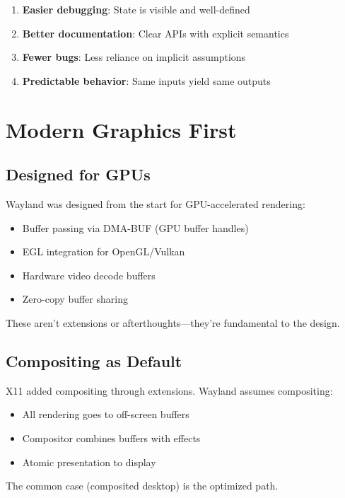 \begin{enumerate}
    \item \textbf{Easier debugging}: State is visible and well-defined
    \item \textbf{Better documentation}: Clear APIs with explicit semantics
    \item \textbf{Fewer bugs}: Less reliance on implicit assumptions
    \item \textbf{Predictable behavior}: Same inputs yield same outputs
\end{enumerate}

\section{Modern Graphics First}

\subsection{Designed for GPUs}

Wayland was designed from the start for GPU-accelerated rendering:

\begin{itemize}
    \item Buffer passing via DMA-BUF (GPU buffer handles)
    \item EGL integration for OpenGL/Vulkan
    \item Hardware video decode buffers
    \item Zero-copy buffer sharing
\end{itemize}

These aren't extensions or afterthoughts—they're fundamental to the design.

\subsection{Compositing as Default}

X11 added compositing through extensions. Wayland assumes compositing:

\begin{itemize}
    \item All rendering goes to off-screen buffers
    \item Compositor combines buffers with effects
    \item Atomic presentation to display
\end{itemize}

The common case (composited desktop) is the optimized path.

